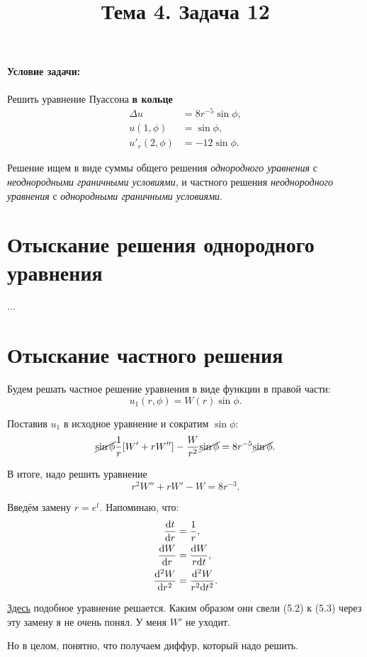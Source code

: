\documentclass{report}
\title{Тема 4. Задача 12}
\begin{document}
	\maketitle
	
\paragraph{Условие задачи: }
Решить уравнение Пуассона \textbf{в кольце}
\begin{align*}
	\Delta u &= 8r^{-5}\sin\phi, \\
	u(1,\phi) &= \sin\phi, \\
	u'_r(2,\phi) &= -12\sin\phi.
\end{align*}

Решение ищем в виде суммы общего решения \emph{однородного уравнения} с \emph{неоднородными граничными условиями},
и частного решения \emph{неоднородного уравнения} с \emph{однородными граничными условиями}.

\section{Отыскание решения однородного уравнения}
...
\section{Отыскание частного решения}
Будем решать частное решение уравнения в виде функции в правой части: 
\[
u_1(r,\phi) = W(r)\sin\phi.
\]

Поставив $u_1$ в исходное уравнение и сократим $\sin\phi$:
\[
\cancel{\sin\phi}\frac1r[W' + rW''] - \frac{W}{r^2}\cancel{\sin\phi} = 8r^{-5}\cancel{\sin\phi}.
\]

В итоге, надо решить уравнение
\begin{equation}\label{eq:Difur}
	r^2W'' + rW' - W = 8r^{-3}.
\end{equation}

Введём замену $r = e^t$. Напоминаю, что:
\begin{align*}
	\frac{\mathrm d t}{\mathrm d r} &= \frac1r, \\
	\frac{\mathrm d W}{\mathrm d r} &= \frac{\mathrm d W}{r\mathrm d t}, \\
	\frac{\mathrm d^2 W}{\mathrm d r^2} &= \frac{\mathrm d^2 W}{r^2\mathrm d t^2}.
\end{align*}

\href{http://www.studentlibrary.ru/doc/bauman_0018-SCN0006/001.html}{Здесь} подобное уравнение решается.
Каким образом они свели (5.2) к (5.3) через эту замену я не очень понял. У меня $W'$ не уходит.

Но в целом, понятно, что получаем диффур, который надо решить.
\end{document}
